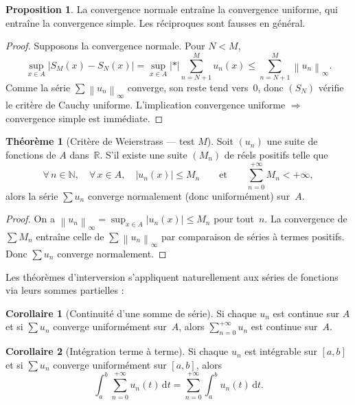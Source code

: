 \documentclass[12pt,a4paper,openany]{book}
\theoremstyle{definition}
\newtheorem{theoreme}{Théorème}[chapter]
\newtheorem{proposition}{Proposition}[chapter]
\newtheorem{corollaire}{Corollaire}[chapter]
\newcommand{\N}{\mathbb{N}}
\newcommand{\R}{\mathbb{R}}
\newcommand{\abs}[1]{\left\lvert #1 \right\rvert}
\newcommand{\norm}[1]{\left\lVert #1 \right\rVert}
\newcommand{\dd}{\mathrm{d}}
\begin{document}
\begin{proposition}\label{prop:normale-uniforme}
  La convergence normale entraîne la convergence uniforme, qui entraîne la convergence simple. Les réciproques sont fausses en général.
\end{proposition}

\begin{proof}
  Supposons la convergence normale. Pour $N < M$,
  \[
    \sup_{x \in A}\abs{S_M(x) - S_N(x)} = \sup_{x \in A}\abs*{\sum_{n=N+1}^{M} u_n(x)}
    \leqslant \sum_{n=N+1}^{M} \norm{u_n}_\infty.
  \]
  Comme la série $\sum \norm{u_n}_\infty$ converge, son reste tend vers~$0$, donc $(S_N)$ vérifie le critère de Cauchy uniforme. L'implication convergence uniforme $\Rightarrow$ convergence simple est immédiate.
\end{proof}

\begin{theoreme}[Critère de Weierstrass --- test $M$]\label{thm:weierstrass-M}
  Soit $(u_n)$ une suite de fonctions de $A$ dans~$\R$. S'il existe une suite $(M_n)$ de réels positifs telle que
  \[
    \forall\, n \in \N, \quad \forall\, x \in A, \quad \abs{u_n(x)} \leqslant M_n
    \qquad \text{et} \qquad \sum_{n=0}^{+\infty} M_n < +\infty,
  \]
  alors la série $\sum u_n$ converge normalement (donc uniformément) sur~$A$.
\end{theoreme}

\begin{proof}
  On a $\norm{u_n}_\infty = \sup_{x \in A}\abs{u_n(x)} \leqslant M_n$ pour tout~$n$. La convergence de $\sum M_n$ entraîne celle de $\sum \norm{u_n}_\infty$ par comparaison de séries à termes positifs. Donc $\sum u_n$ converge normalement.
\end{proof}

Les théorèmes d'interversion s'appliquent naturellement aux séries de fonctions via leurs sommes partielles :

\begin{corollaire}[Continuité d'une somme de série]\label{cor:continuite-serie}
  Si chaque $u_n$ est continue sur $A$ et si $\sum u_n$ converge uniformément sur~$A$, alors $\sum_{n=0}^{+\infty} u_n$ est continue sur~$A$.
\end{corollaire}

\begin{corollaire}[Intégration terme à terme]\label{cor:integration-terme-a-terme}
  Si chaque $u_n$ est intégrable sur $[a,b]$ et si $\sum u_n$ converge uniformément sur $[a,b]$, alors
  \[
    \int_a^b \sum_{n=0}^{+\infty} u_n(t)\,\dd t = \sum_{n=0}^{+\infty} \int_a^b u_n(t)\,\dd t.
  \]
\end{corollaire}
\end{document}
